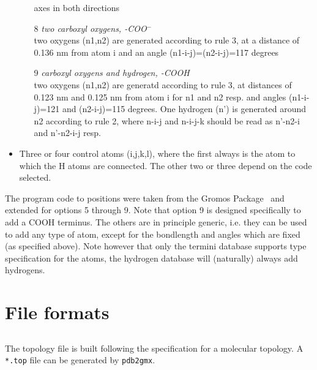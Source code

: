 \begin{itemize}
\begin{enumerate}
axes in both directions
\item[8]{\em two carboxyl oxygens, -COO{$^-$}}\\
two oxygens (n1,n2) are generated according to rule 3, at a distance
of 0.136 nm from atom i and an angle (n1-i-j)=(n2-i-j)=117 degrees
\item[9]{\em carboxyl oxygens and hydrogen, -COOH}\\
two oxygens (n1,n2) are generatd according to rule 3, at distances of
0.123 nm and 0.125 nm from atom i for n1 and n2 resp. and angles
(n1-i-j)=121 and (n2-i-j)=115 degrees. One hydrogen (n') is generated
around n2 according to rule 2, where n-i-j and n-i-j-k should be read
as n'-n2-i and n'-n2-i-j resp.
\end{enumerate}
\item
Three or four control atoms (i,j,k,l), where the first always is the
atom to which the H atoms are connected. The other two or three depend
on the code selected.
\end{itemize}

The program code to  positions were taken
from the Gromos Package~\cite{biomos} and extended for options 5
through 9. Note that option 9 is designed specifically to add a COOH
terminus. The others are in principle generic, i.e. they can be used
to add any type of atom, except for the bondlength and angles which
are fixed (as specified above). Note however that only the termini
database supports type specification for the atoms, the hydrogen
database will (naturally) always add hydrogens.

\section{File formats}
\subsection{}
\label{subsec:topfile}
The topology file is built following the {\gromacs} specification for a
molecular topology.  A \verb'*.top' file can be generated by
\verb'pdb2gmx'.

